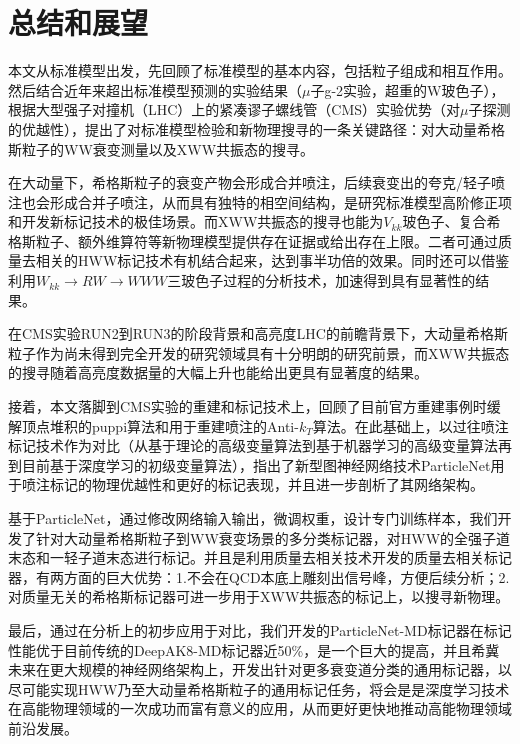 \chapter{总结和展望}
\fontsize{12bp}{14.4pt}

本文从标准模型出发，先回顾了标准模型的基本内容，包括粒子组成和相互作用。然后结合近年来超出标准模型预测的实验结果（$\mu$子g-2实验，超重的W玻色子），根据大型强子对撞机（LHC）上的紧凑谬子螺线管（CMS）实验优势（对$\mu$子探测的优越性），提出了对标准模型检验和新物理搜寻的一条关键路径：对大动量希格斯粒子的WW衰变测量以及XWW共振态的搜寻。

在大动量下，希格斯粒子的衰变产物会形成合并喷注，后续衰变出的夸克/轻子喷注也会形成合并子喷注，从而具有独特的相空间结构，是研究标准模型高阶修正项和开发新标记技术的极佳场景。而XWW共振态的搜寻也能为$V_{kk}$玻色子、复合希格斯粒子、额外维算符等新物理模型提供存在证据或给出存在上限。二者可通过质量去相关的HWW标记技术有机结合起来，达到事半功倍的效果。同时还可以借鉴利用$W_{kk}\to RW\to WWW$三玻色子过程的分析技术，加速得到具有显著性的结果。

在CMS实验RUN2到RUN3的阶段背景和高亮度LHC的前瞻背景下，大动量希格斯粒子作为尚未得到完全开发的研究领域具有十分明朗的研究前景，而XWW共振态的搜寻随着高亮度数据量的大幅上升也能给出更具有显著度的结果。

接着，本文落脚到CMS实验的重建和标记技术上，回顾了目前官方重建事例时缓解顶点堆积的puppi算法和用于重建喷注的Anti-$k_T$算法。在此基础上，以过往喷注标记技术作为对比（从基于理论的高级变量算法到基于机器学习的高级变量算法再到目前基于深度学习的初级变量算法），指出了新型图神经网络技术ParticleNet用于喷注标记的物理优越性和更好的标记表现，并且进一步剖析了其网络架构。

基于ParticleNet，通过修改网络输入输出，微调权重，设计专门训练样本，我们开发了针对大动量希格斯粒子到WW衰变场景的多分类标记器，对HWW的全强子道末态和一轻子道末态进行标记。并且是利用质量去相关技术开发的质量去相关标记器，有两方面的巨大优势：1.不会在QCD本底上雕刻出信号峰，方便后续分析；2.对质量无关的希格斯标记器可进一步用于XWW共振态的标记上，以搜寻新物理。

最后，通过在分析上的初步应用于对比，我们开发的ParticleNet-MD标记器在标记性能优于目前传统的DeepAK8-MD标记器近50\%，是一个巨大的提高，并且希冀未来在更大规模的神经网络架构上，开发出针对更多衰变道分类的通用标记器，以尽可能实现HWW乃至大动量希格斯粒子的通用标记任务，将会是是深度学习技术在高能物理领域的一次成功而富有意义的应用，从而更好更快地推动高能物理领域前沿发展。